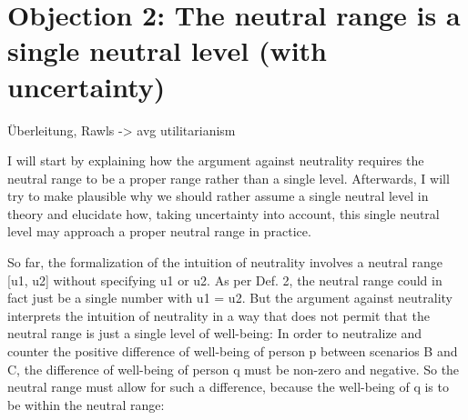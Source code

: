 \section{Objection 2: The neutral range is a single neutral level (with uncertainty)}

Überleitung, Rawls -{\textgreater} avg utilitarianism 

I will start by explaining how the argument against neutrality requires the neutral range to be a proper range rather than a single level. Afterwards, I will try to make plausible why we should rather assume a single neutral level in theory and elucidate how, taking uncertainty into account, this single neutral level may approach a proper neutral range in practice.  

So far, the formalization of the intuition of neutrality involves a neutral range [u1, u2] without specifying u1 or u2. As per Def. 2, the neutral range could in fact just be a single number with u1 = u2. But the argument against neutrality interprets the intuition of neutrality in a way that does not permit that the neutral range is just a single level of well-being: In order to neutralize and counter the positive difference of well-being of person p between scenarios B and C, the difference of well-being of person q must be non-zero and negative. So the neutral range must allow for such a difference, because the well-being of q is to be within the neutral range:  
\begin{comment}
\begin{flushleft} \tablefirsthead{} \tablehead{} \tabletail{} \tablelasttail{} \begin{supertabular}{m{1.201cm}m{13.639cm}} (C10) & (A2) \ \ ${\wedge}$ (A3) \ $\Rightarrow $ \ uB(p) {\textgreater} uC(p)\\ (C11) & (C10) ${\wedge}$ (A5) \ $\Rightarrow $ \ uB(q) {\textless} uC(q)\\ (C12) & (C11) ${\wedge}$ (A4) \ $\Rightarrow $ \ u1 {\textless} u2\\ \end{supertabular} \end{flushleft} Formally (C12), as an implication of the argument against neutrality, is a substantive specification of the intuition of neutrality. But contentwise (C12) is completely in line with the idea behind the intuition of neutrality (cf. \label{ref:RND8nKulQFNSj}Broome 2004, p. 146): Added lives are neutral except if they are at a very low or very high level of well-being (\label{ref:RNDjFXco5Qn80}Broome 2012, p. 172), so the neutral range is not only a proper range but also a rather big range.  
\end{comment}
